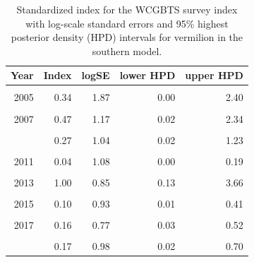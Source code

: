 \documentclass[11pt,
  english,
]{article}
\begin{document}
\begin{table}

\caption{\label{tab:tab-index-wcgbts}Standardized index for the WCGBTS survey index with log-scale standard errors and 95\% highest
       posterior density (HPD) intervals for vermilion in the southern model.}
\centering
\begin{tabular}[t]{rrrrr}
\toprule
Year & Index & logSE & lower HPD & upper HPD\\
\midrule
\cellcolor{gray!6}{2003} & \cellcolor{gray!6}{0.78} & \cellcolor{gray!6}{1.26} & \cellcolor{gray!6}{0.03} & \cellcolor{gray!6}{4.10}\\
2005 & 0.34 & 1.87 & 0.00 & 2.40\\
\cellcolor{gray!6}{2006} & \cellcolor{gray!6}{0.13} & \cellcolor{gray!6}{1.16} & \cellcolor{gray!6}{0.01} & \cellcolor{gray!6}{0.62}\\
2007 & 0.47 & 1.17 & 0.02 & 2.34\\
\cellcolor{gray!6}{2008} & \cellcolor{gray!6}{0.83} & \cellcolor{gray!6}{1.01} & \cellcolor{gray!6}{0.07} & \cellcolor{gray!6}{3.58}\\
\addlinespace
2009 & 0.27 & 1.04 & 0.02 & 1.23\\
\cellcolor{gray!6}{2010} & \cellcolor{gray!6}{0.19} & \cellcolor{gray!6}{1.01} & \cellcolor{gray!6}{0.02} & \cellcolor{gray!6}{0.79}\\
2011 & 0.04 & 1.08 & 0.00 & 0.19\\
\cellcolor{gray!6}{2012} & \cellcolor{gray!6}{1.81} & \cellcolor{gray!6}{1.46} & \cellcolor{gray!6}{0.04} & \cellcolor{gray!6}{10.72}\\
2013 & 1.00 & 0.85 & 0.13 & 3.66\\
\addlinespace
\cellcolor{gray!6}{2014} & \cellcolor{gray!6}{3.72} & \cellcolor{gray!6}{1.01} & \cellcolor{gray!6}{0.30} & \cellcolor{gray!6}{16.34}\\
2015 & 0.10 & 0.93 & 0.01 & 0.41\\
\cellcolor{gray!6}{2016} & \cellcolor{gray!6}{0.22} & \cellcolor{gray!6}{0.88} & \cellcolor{gray!6}{0.03} & \cellcolor{gray!6}{0.82}\\
2017 & 0.16 & 0.77 & 0.03 & 0.52\\
\cellcolor{gray!6}{2018} & \cellcolor{gray!6}{0.61} & \cellcolor{gray!6}{0.91} & \cellcolor{gray!6}{0.07} & \cellcolor{gray!6}{2.34}\\
\addlinespace
2019 & 0.17 & 0.98 & 0.02 & 0.70\\
\bottomrule
\end{tabular}
\end{table}
\end{document}
